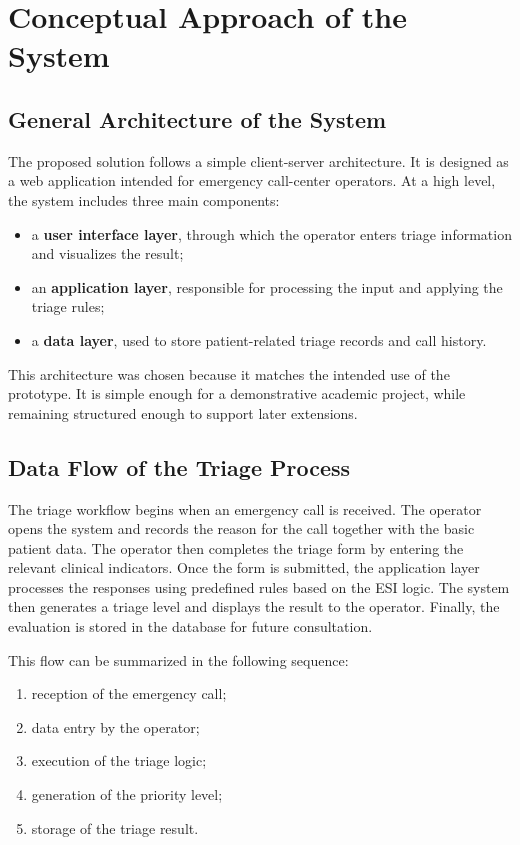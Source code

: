\documentclass[a4paper,12pt,oneside]{report}
\begin{document}
\section{Conceptual Approach of the System}

\subsection{General Architecture of the System}

The proposed solution follows a simple client-server architecture. It is designed as a web application intended for emergency call-center operators. At a high level, the system includes three main components:

\begin{itemize}
    \item a \textbf{user interface layer}, through which the operator enters triage information and visualizes the result;
    \item an \textbf{application layer}, responsible for processing the input and applying the triage rules;
    \item a \textbf{data layer}, used to store patient-related triage records and call history.
\end{itemize}

This architecture was chosen because it matches the intended use of the prototype. It is simple enough for a demonstrative academic project, while remaining structured enough to support later extensions.

\subsection{Data Flow of the Triage Process}

The triage workflow begins when an emergency call is received. The operator opens the system and records the reason for the call together with the basic patient data. The operator then completes the triage form by entering the relevant clinical indicators. Once the form is submitted, the application layer processes the responses using predefined rules based on the ESI logic. The system then generates a triage level and displays the result to the operator. Finally, the evaluation is stored in the database for future consultation.

This flow can be summarized in the following sequence:

\begin{enumerate}
    \item reception of the emergency call;
    \item data entry by the operator;
    \item execution of the triage logic;
    \item generation of the priority level;
    \item storage of the triage result.
\end{enumerate}
\end{document}
